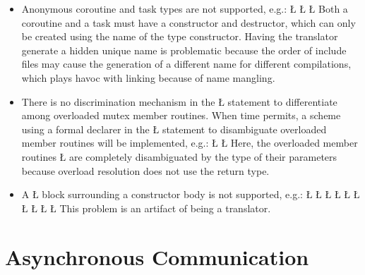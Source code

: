 \documentclass[openright,twoside]{report}
\begin{document}
\begin{itemize}
\item
Anonymous coroutine and task types are not supported, e.g.:
\LGinlinefalse\LGbegin\lgrinde
\L{}
\CE{}\L{\LB{}}
\L{}
\endlgrinde\LGend
Both a coroutine and a task must have a constructor and destructor, which can only be created using the name of the type constructor.
Having the translator generate a hidden unique name is problematic because the order of include files may cause the generation of a different name for different compilations, which plays havoc with linking because of name mangling.

\item
There is no discrimination mechanism in the \LGinlinetrue\LGbegin\lgrinde\L{}\endlgrinde\LGend{} statement to differentiate among overloaded mutex member routines.
When time permits, a scheme using a formal declarer in the \LGinlinetrue\LGbegin\lgrinde\L{}\endlgrinde\LGend{} statement to disambiguate overloaded member routines will be implemented, e.g.:
\LGinlinefalse\LGbegin\lgrinde
\L{}
\L{}
\endlgrinde\LGend
Here, the overloaded member routines \LGinlinetrue\LGbegin\lgrinde\L{}\endlgrinde\LGend{} are completely disambiguated by the type of their parameters because \CC overload resolution does not use the return type.

\item
A \LGinlinetrue\LGbegin\lgrinde\L{}\endlgrinde\LGend{} block surrounding a constructor body is not supported, e.g.:
\LGinlinefalse\LGbegin\lgrinde
\L{}
\L{\LB{}}
\L{}
\L{\LB{}}
\CE{}\L{\LB{\};}}
\L{}
\L{\LB{}}
\CE{}\L{}
\L{\LB{}}
\CE{}\L{\LB{\}}}
\endlgrinde\LGend
This problem is an artifact of \uC being a translator.
\end{itemize}


\chapter{Asynchronous Communication}
\label{s:AsynchronousCommunication}
\end{document}
